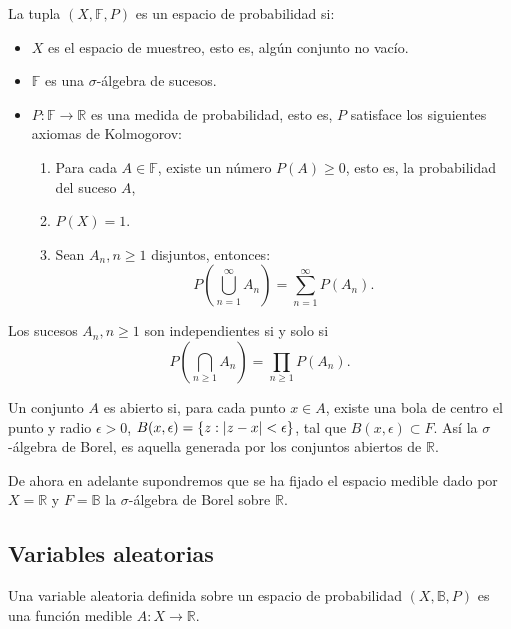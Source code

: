 \documentclass[../proyecto.tex]{memoir}
\begin{document}
\begin{defi}
La tupla $(X, \mathds{F}, P)$ es un espacio de probabilidad si:
\begin{itemize}
\item $X$ es el espacio de muestreo, esto es, algún conjunto no vacío.
\item $\mathds{F}$ es una $\sigma$-álgebra de sucesos.
\item $P: \mathds{F} \to \mathds{R}$ es una medida de probabilidad, 
esto es, $P$ satisface los siguientes axiomas de Kolmogorov:
\begin{enumerate}
\item Para cada $A\in\mathds{F}$, existe un número $P(A) \geq 0$, esto es, la probabilidad del suceso $A$,
\item $P(X)=1$.
\item Sean ${A_n, n \geq 1}$ disjuntos, entonces: $$
	P \left( \bigcup_{n=1}^{\infty} A_{n} \right) = \sum_{n=1}^{\infty} P(A_n).
$$
\end{enumerate}
\end{itemize}
\end{defi}

\begin{defi}
Los sucesos ${A_n, n \geq 1}$ son independientes si y solo si $$
P \left( \bigcap_{n \geq 1} A_{n} \right) = \prod_{n \geq 1} P(A_n).
$$
\end{defi}

\begin{defi}
Un conjunto $A$ es abierto si, para cada punto $x\in A$, existe una bola de centro el punto y radio $\epsilon > 0$, $B(x,\epsilon)=\{ z : \abs{z-x} < \epsilon\}$, tal que $B(x,\epsilon) \subset F$. Así la $\sigma$-álgebra de Borel, es aquella generada por los conjuntos abiertos de $\mathds{R}$.
\end{defi}

De ahora en adelante supondremos que se ha fijado el espacio medible dado por $X=\mathds{R}$ y $F=\mathds{B}$ la $\sigma$-álgebra de Borel sobre $\mathds{R}$.

\subsection{Variables aleatorias}

\begin{defi}
Una variable aleatoria definida sobre un espacio de probabilidad $(X, \mathds{B}, P)$ es una función medible $A: X \to \mathds{R}$.
\end{defi}
\end{document}
